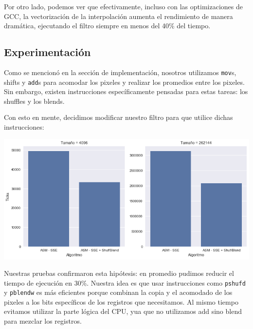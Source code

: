 Por otro lado, podemos ver que efectivamente, incluso con las optimizaciones de GCC, la vectorización de la interpolación aumenta el rendimiento de manera dramática, ejecutando el filtro siempre en menos del 40\% del tiempo.

\subsection{Experimentación}

Como se mencionó en la sección de implementación, nosotros utilizamos \texttt{mov}s, shifts y \texttt{add}s para acomodar los pixeles y realizar los promedios entre los pixeles. Sin embargo, existen instrucciones específicamente pensadas para estas tareas: los shuffles y los blends.

Con esto en mente, decidimos modificar nuestro filtro para que utilice dichas instrucciones:

\begin{center}
  \includegraphics[scale=0.5]{img/linearZoom_shuf_bars.png}
\end{center}

Nuestras pruebas confirmaron esta hipótesis: en promedio pudimos reducir el tiempo de ejecución en 30\%. Nuestra idea es que usar instrucciones como \texttt{pshufd} y \texttt{pblendw} es más eficientes porque combinan la copia y el acomodado de los pixeles a los bits específicos de los registros que necesitamos. Al mismo tiempo evitamos utilizar la parte lógica del CPU, yua que no utilizamos add sino blend para mezclar los registros.